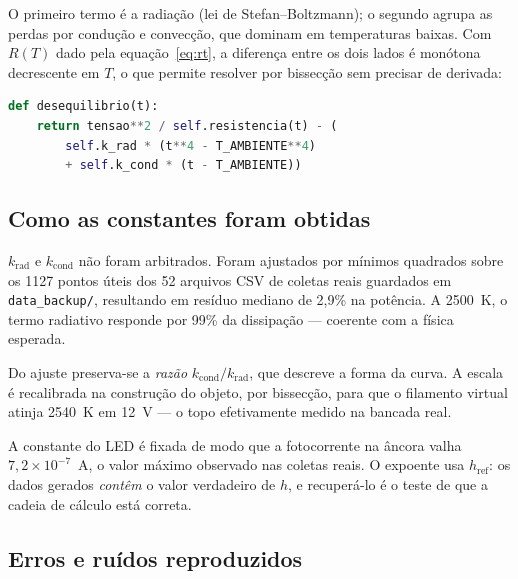 \documentclass[11pt,a4paper]{article}
\begin{document}
O primeiro termo é a radiação (lei de Stefan--Boltzmann); o segundo agrupa as
perdas por condução e convecção, que dominam em temperaturas baixas. Com
$R(T)$ dado pela equação~\eqref{eq:rt}, a diferença entre os dois lados é
monótona decrescente em $T$, o que permite resolver por bissecção sem precisar
de derivada:

\begin{lstlisting}[language=Python]
def desequilibrio(t):
    return tensao**2 / self.resistencia(t) - (
        self.k_rad * (t**4 - T_AMBIENTE**4)
        + self.k_cond * (t - T_AMBIENTE))
\end{lstlisting}

\subsection{Como as constantes foram obtidas}

$k_{\text{rad}}$ e $k_{\text{cond}}$ não foram arbitrados. Foram ajustados por
mínimos quadrados sobre os 1127 pontos úteis dos 52 arquivos CSV de coletas
reais guardados em \texttt{data\_backup/}, resultando em resíduo mediano de
2{,}9\% na potência. A 2500~K, o termo radiativo responde por 99\% da
dissipação --- coerente com a física esperada.

Do ajuste preserva-se a \emph{razão} $k_{\text{cond}}/k_{\text{rad}}$, que
descreve a forma da curva. A escala é recalibrada na construção do objeto, por
bissecção, para que o filamento virtual atinja 2540~K em 12~V --- o topo
efetivamente medido na bancada real.

A constante do LED é fixada de modo que a fotocorrente na âncora valha
$7{,}2 \times 10^{-7}$~A, o valor máximo observado nas coletas reais. O
expoente usa $h_{\text{ref}}$: os dados gerados \emph{contêm} o valor
verdadeiro de $h$, e recuperá-lo é o teste de que a cadeia de cálculo está
correta.

\subsection{Erros e ruídos reproduzidos}
\end{document}

